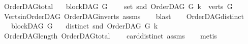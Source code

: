 \begin{isabellebody}
\isanewline
%
\endisadelimproof
\isanewline
{}\isamarkupfalse%
\ OrderDAG{\isacharunderscore}{\kern0pt}total{\isacharcolon}{\kern0pt}\isanewline
\ \ \ {\isachardoublequoteopen}blockDAG\ G{\isachardoublequoteclose}\ \isanewline
\ \ \ {\isachardoublequoteopen}set\ {\isacharparenleft}{\kern0pt}snd\ {\isacharparenleft}{\kern0pt}OrderDAG\ G\ k{\isacharparenright}{\kern0pt}{\isacharparenright}{\kern0pt}\ {\isacharequal}{\kern0pt}\ verts\ G{\isachardoublequoteclose}\isanewline
%
\isadelimproof
\ \ %
\endisadelimproof
%
\isatagproof
{}\isamarkupfalse%
\ Verts{\isacharunderscore}{\kern0pt}in{\isacharunderscore}{\kern0pt}OrderDAG\ OrderDAG{\isacharunderscore}{\kern0pt}in{\isacharunderscore}{\kern0pt}verts\ assms{\isacharparenleft}{\kern0pt}{}{\isacharparenright}{\kern0pt}\isanewline
\ \ \isamarkupfalse%
\ blast%
\endisatagproof
{\isafoldproof}%
%
\isadelimproof
\ \isanewline
%
\endisadelimproof
\isanewline
{}\isamarkupfalse%
\ \ OrderDAG{\isacharunderscore}{\kern0pt}distinct{\isacharcolon}{\kern0pt}\isanewline
\ \ \ {\isachardoublequoteopen}blockDAG\ G{\isachardoublequoteclose}\isanewline
\ \ \ {\isachardoublequoteopen}distinct\ {\isacharparenleft}{\kern0pt}snd\ {\isacharparenleft}{\kern0pt}OrderDAG\ G\ k{\isacharparenright}{\kern0pt}{\isacharparenright}{\kern0pt}{\isachardoublequoteclose}\isanewline
%
\isadelimproof
\ \ %
\endisadelimproof
%
\isatagproof
{}\isamarkupfalse%
\ OrderDAG{\isacharunderscore}{\kern0pt}length\ OrderDAG{\isacharunderscore}{\kern0pt}total\isanewline
\ \ \ \ card{\isacharunderscore}{\kern0pt}distinct\ assms\isanewline
\ \ \isamarkupfalse%
\ metis%
\endisatagproof
{\isafoldproof}%
%
\isadelimproof
\ \isanewline
%
\endisadelimproof
\isanewline
\isanewline
\isanewline
\isanewline
\isanewline
%
\isadelimtheory
\isanewline
%
\endisadelimtheory
%
\isatagtheory
{}\isamarkupfalse%
%
\endisatagtheory
{\isafoldtheory}%
%
\isadelimtheory
%
\endisadelimtheory
%
\end{isabellebody}%
\endinput
